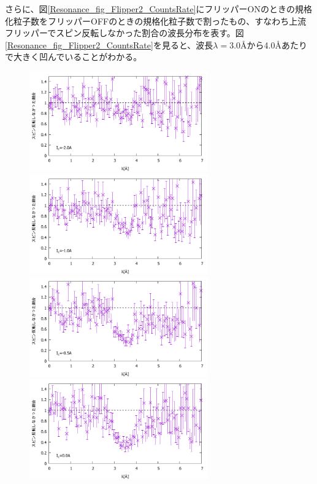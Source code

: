 さらに、図\ref{Resonance_fig_Flipper2_CountsRate}にフリッパーONのときの規格化粒子数をフリッパーOFFのときの規格化粒子数で割ったもの、すなわち上流フリッパーでスピン反転しなかった割合の波長分布を表す。図\ref{Resonance_fig_Flipper2_CountsRate}を見ると、波長$\lambda=$3.0{\AA}から4.0{\AA}あたりで大きく凹んでいることがわかる。
\begin{figure}[h]
\includegraphics[height=4.3cm]{resonance/analysis/Flipper2_CountsRate_-20A.pdf}
\includegraphics[height=4.3cm]{resonance/analysis/Flipper2_CountsRate_-10A.pdf}\\
\includegraphics[height=4.3cm]{resonance/analysis/Flipper2_CountsRate_-5A.pdf}
\includegraphics[height=4.3cm]{resonance/analysis/Flipper2_CountsRate_0A.pdf}\\

\end{figure}
